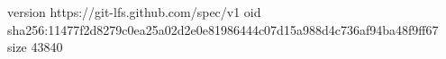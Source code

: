version https://git-lfs.github.com/spec/v1
oid sha256:11477f2d8279c0ea25a02d2e0e81986444c07d15a988d4c736af94ba48f9ff67
size 43840

